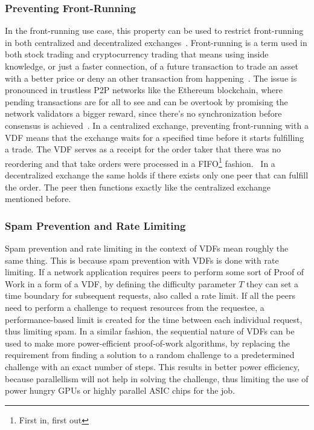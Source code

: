 \subsubsection{Preventing Front-Running}
In the front-running use case, this property can be used to restrict front-running in both centralized and decentralized exchanges~\cite{Khalil2019-sl}. Front-running is a term used in both stock trading and cryptocurrency trading that means using inside knowledge, or just a faster connection, of a future transaction to trade an asset with a better price or deny an other transaction from happening~\cite{Robinson2020-ve}. The issue is pronounced in trustless P2P networks like the Ethereum blockchain, where pending transactions are for all to see and can be overtook by promising the network validators a bigger reward, since there's no synchronization before consensus is achieved~\cite{Mitchell2020-hn}. In a centralized exchange, preventing front-running with a VDF means that the exchange waits for a specified time before it starts fulfilling a trade. The VDF serves as a receipt for the order taker that there was no reordering and that take orders were processed in a FIFO\footnote{First in, first out} fashion.~\cite{Cline2020-wb} In a decentralized exchange the same holds if there exists only one peer that can fulfill the order. The peer then functions exactly like the centralized exchange mentioned before.

\subsubsection{Spam Prevention and Rate Limiting}
Spam prevention and rate limiting in the context of VDFs mean roughly the same thing. This is because spam prevention with VDFs is done with rate limiting. If a network application requires peers to perform some sort of Proof of Work in a form of a VDF, by defining the difficulty parameter \(T\) they can set a time boundary for subsequent requests, also called a rate limit. If all the peers need to perform a challenge to request resources from the requestee, a performance-based limit is created for the time between each individual request, thus limiting spam. In a similar fashion, the sequential nature of VDFs can be used to make more power-efficient proof-of-work algorithms, by replacing the requirement from finding a solution to a random challenge to a predetermined challenge with an exact number of steps. This results in better power efficiency, because parallellism will not help in solving the challenge, thus limiting the use of power hungry GPUs or highly parallel ASIC chips for the job.

